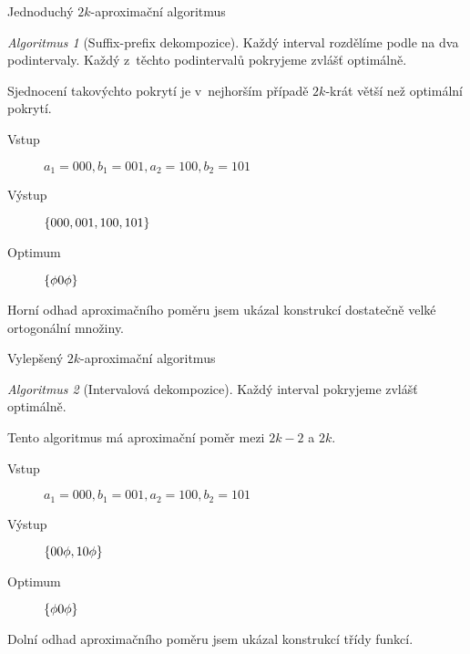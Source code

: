 \documentclass{beamer}
\theoremstyle{remark}
\newtheorem{algorithm}{Algoritmus}
\begin{document}
\begin{frame}{Jednoduchý $2k$-aproximační algoritmus}
\begin{algorithm}[Suffix-prefix dekompozice]
Každý interval rozdělíme podle na dva  podintervaly.
Každý z~těchto podintervalů pokryjeme zvlášť optimálně.
\end{algorithm}

Sjednocení takovýchto pokrytí je v~nejhorším případě $2k$-krát větší než optimální pokrytí.

\begin{example}
\begin{description}
\item[Vstup]
$a_1 = 000, b_1 = 001, a_2 = 100, b_2 = 101$

\item[Výstup]
$\{000, 001, 100, 101\}$

\item[Optimum]
$\{\phi 0 \phi\}$
\end{description}
\end{example}

Horní odhad aproximačního poměru jsem ukázal konstrukcí dostatečně velké ortogonální množiny.
\end{frame}

\begin{frame}{Vylepšený $2k$-aproximační algoritmus}
\begin{algorithm}[Intervalová dekompozice]
Každý interval pokryjeme zvlášť optimálně.
\end{algorithm}

Tento algoritmus má aproximační poměr mezi $2k-2$ a $2k$.

\begin{example}
\begin{description}
\item[Vstup]
$a_1 = 000, b_1 = 001, a_2 = 100, b_2 = 101$

\item[Výstup]
$\{00 \phi, 10 \phi\}$

\item[Optimum]
$\{\phi 0 \phi\}$
\end{description}
\end{example}

Dolní odhad aproximačního poměru jsem ukázal konstrukcí třídy  funkcí.
\end{frame}

\end{document}
